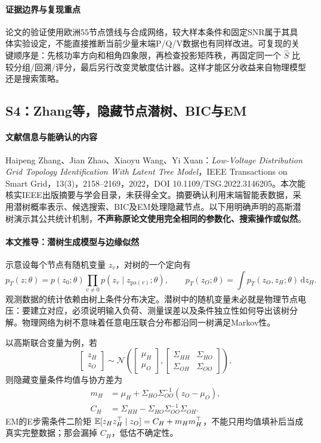 \paragraph{证据边界与复现重点}
论文的验证使用欧洲55节点馈线与合成网络，较大样本条件和固定SNR属于其具体实验设定，不能直接推断当前少量末端P/Q/V数据也有同样改进。可复现的关键顺序是：先核功率方向和相角四象限，再检查投影矩阵秩，再固定同一个 $\widehat S$ 比较分组/回溯/评分，最后另行改变灵敏度估计器。这样才能区分收益来自物理模型还是搜索策略。

\subsection{S4：Zhang等，隐藏节点潜树、BIC与EM}
\paragraph{文献信息与能确认的内容}
Haipeng Zhang、Jian Zhao、Xiaoyu Wang、Yi Xuan：\emph{Low-Voltage Distribution Grid Topology Identification With Latent Tree Model}，IEEE Transactions on Smart Grid，13(3)，2158--2169，2022，DOI 10.1109/TSG.2022.3146205\citep{S4}。本次能核实IEEE出版摘要与学会目录，未获得全文。摘要确认利用末端智能表数据，采用潜树概率表示、候选搜索、BIC及EM处理隐藏节点。以下用明确声明的高斯潜树演示其公共统计机制，\textbf{不声称原论文使用完全相同的参数化、搜索操作或似然}。

\paragraph{本文推导：潜树生成模型与边缘似然}
示意设每个节点有随机变量 $z_v$，对树的一个定向有
\begin{equation}
 p_T(z;\theta)=p(z_0;\theta)\prod_{v\ne0}p(z_v\mid z_{\mathrm{pa}(v)};\theta),
 \qquad p_T(z_O;\theta)=\int p_T(z_O,z_H;\theta)\,\mathrm dz_H.
\end{equation}
观测数据的统计依赖由树上条件分布决定。潜树中的随机变量未必就是物理节点电压：要建立对应，必须说明输入负荷、测量误差以及条件独立性如何导出该树分解。物理网络为树不意味着任意电压联合分布都沿同一树满足Markov性。

以高斯联合变量为例，若
\begin{equation}
 \begin{bmatrix}z_H\\z_O\end{bmatrix}\sim
 \mathcal N\left(\begin{bmatrix}\mu_H\\\mu_O\end{bmatrix},
 \begin{bmatrix}\Sigma_{HH}&\Sigma_{HO}\\\Sigma_{OH}&\Sigma_{OO}\end{bmatrix}\right),
\end{equation}
则隐藏变量条件均值与协方差为
\begin{align}
 m_H&=\mu_H+\Sigma_{HO}\Sigma_{OO}^{-1}(z_O-\mu_O),\\
 C_H&=\Sigma_{HH}-\Sigma_{HO}\Sigma_{OO}^{-1}\Sigma_{OH}.
\end{align}
EM的E步需条件二阶矩 $\mathbb{E}[z_Hz_H^\top\mid z_O]=C_H+m_Hm_H^\top$，不能只用均值填补后当成真实完整数据；那会漏掉 $C_H$，低估不确定性。

